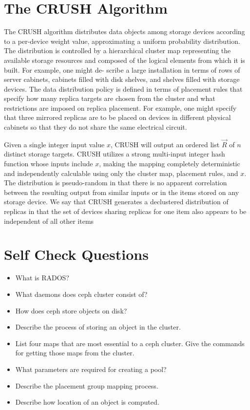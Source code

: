 \documentclass[12pt,a4paper]{report}
\begin{document}
\section{The CRUSH Algorithm}

The CRUSH algorithm distributes data objects among storage devices according to
a per-device weight value, approximating a uniform probability distribution.
The distribution is controlled by a hierarchical cluster map representing the
available storage resources and composed of the logical elements from which it
is built.  For example, one might de- scribe a large installation in terms of
rows of server cabinets, cabinets filled with disk shelves, and shelves filled
with storage devices. The data distribution policy is defined in terms of
placement rules that specify how many replica targets are chosen from the
cluster  and what restrictions are  imposed on replica placement.  For example,
one might specify that three mirrored replicas are  to be  placed on devices in
different physical cabinets so that they do not share the same electrical
circuit.

Given a single integer input value $x$, CRUSH will output an ordered list
$\vec{R}$ of $n$ distinct storage targets. CRUSH utilizes a strong multi-input
integer hash function whose inputs include $x$, making the mapping completely
deterministic and independently calculable using only the cluster map,
placement rules, and $x$. The distribution is pseudo-random in that there is no
apparent correlation between the resulting output from similar inputs or in the
items stored on any storage device. We say that CRUSH generates a declustered
distribution of replicas in that the set of devices sharing replicas for one
item also appears to be independent of all other items

\section{Self Check Questions}

\begin{itemize}
	\item What is RADOS?

	\item What daemons does ceph cluster consist of?

	\item How does ceph store objects on disk?

	\item Describe the process of storing an object in the cluster.

	\item List four maps that are most essential to a ceph cluster. Give
		the commands for getting those maps from the cluster.

	\item What parameters are required for creating a pool?

	\item Describe the placement group mapping process.

	\item Describe how location of an object is computed.
\end{itemize}
\end{document}
